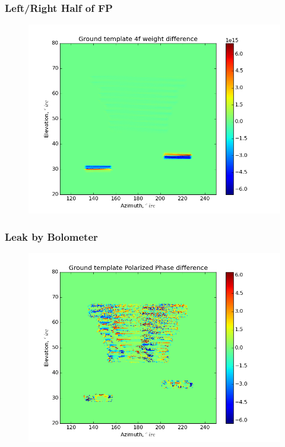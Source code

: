 \documentclass{beamer}
\begin{document}
\begin{frame}
\frametitle{Left/Right Half of FP}
\begin{figure}
\includegraphics[width=0.9\linewidth]{dw4_gt_LHS_RHS.png}
\end{figure}
\end{frame}

\begin{frame}
\frametitle{Leak by Bolometer}
\begin{figure}
\includegraphics[width=0.9\linewidth]{dArg_gt_LEAK_BY_BOLO.png}
\end{figure}
\end{frame}
\end{document}
